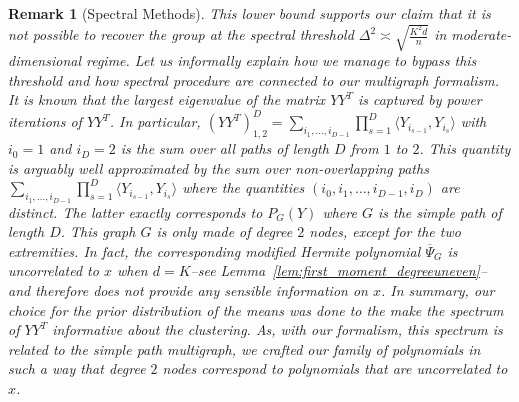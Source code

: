 \documentclass{article}
\newcommand{\alex}[1]{\textcolor{magenta}{[alex: #1]}}
\newtheorem{remark}{Remark}
\begin{document}
        
        
        






    \begin{remark}[Spectral Methods]
    This lower bound supports our claim that it is not possible to recover the group  at the spectral threshold  $\Delta^2 \asymp \sqrt{\frac{K^2 d}{n}}$ in moderate-dimensional regime. Let us informally explain how we manage to bypass this threshold and how spectral procedure are connected to our multigraph formalism. 
    It is known that the largest eigenvalue of the matrix $YY^T$ is captured by power iterations of $YY^T$.
    In particular, $(YY^T)^D_{1,2}= \sum_{i_1,\ldots, i_{D-1}}\prod_{s=1}^{D}\langle Y_{i_{s-1}},Y_{i_s}\rangle$ with $i_0=1$ and $i_D=2$ is the sum over all paths of length $D$ from $1$ to $2$. This quantity is arguably well approximated by the sum over \emph{non-overlapping paths}  $\sum_{i_1,\ldots, i_{D-1}}\prod_{s=1}^{D}\langle Y_{i_{s-1}},Y_{i_s}\rangle$ where the quantities $(i_0,i_1,\ldots, i_{D-1},i_D)$ are distinct. The latter exactly corresponds to $P_{G}(Y)$ where $G$ is the simple path of length $D$. This graph $G$ is only made of  degree $2$ nodes, except for the two extremities. In fact, the corresponding modified Hermite polynomial $\overline{\Psi}_{G}$ is uncorrelated to $x$ when $d=K$--see Lemma~\ref{lem:first_moment_degreeuneven}-- and therefore does not provide any sensible information on $x$. In summary, our choice for the prior distribution of the means was done to the make the spectrum of $YY^T$ informative about the clustering. As, with our formalism, this spectrum is related to the simple path multigraph, we crafted our family of polynomials in such a way that degree $2$ nodes correspond to polynomials that are uncorrelated to $x$.
    \end{remark}
    
\end{document}
